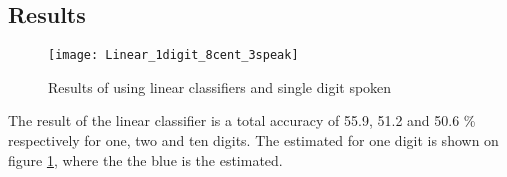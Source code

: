 \subsection*{Results}

\begin{figure}[H]
\centering
\texttt{[image: Linear\_1digit\_8cent\_3speak]}
\caption{Results of using linear classifiers and single digit spoken}
\label{fig:Lin_fig_1}
\end{figure}

The result of the linear classifier is a total accuracy of 55.9, 51.2 and 50.6 \% respectively for one, two and ten digits.
The estimated for one digit is shown on figure \ref{fig:Lin_fig_1}, where the the blue is the estimated. 
